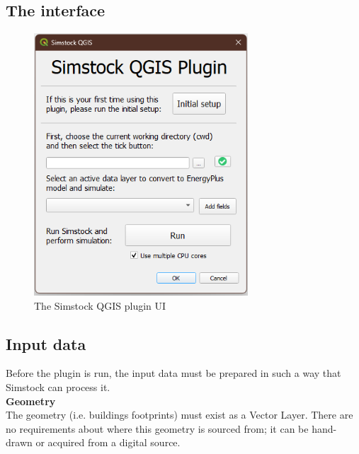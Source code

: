 \documentclass{article}
\begin{document}
\subsection{The interface}
\begin{figure}[h!]
    \centering
    \includegraphics[width=8cm]{Figures/plugin_win11.png}
    \caption{The Simstock QGIS plugin UI}
    \label{fig:pluginui}
\end{figure}

\subsection{Input data}
Before the plugin is run, the input data must be prepared in such a way that Simstock can process it. \\

\textbf{Geometry} \\
The geometry (i.e. buildings footprints) must exist as a Vector Layer. There are no requirements about where this geometry is sourced from; it can be hand-drawn or acquired from a digital source. \\ %
\end{document}
